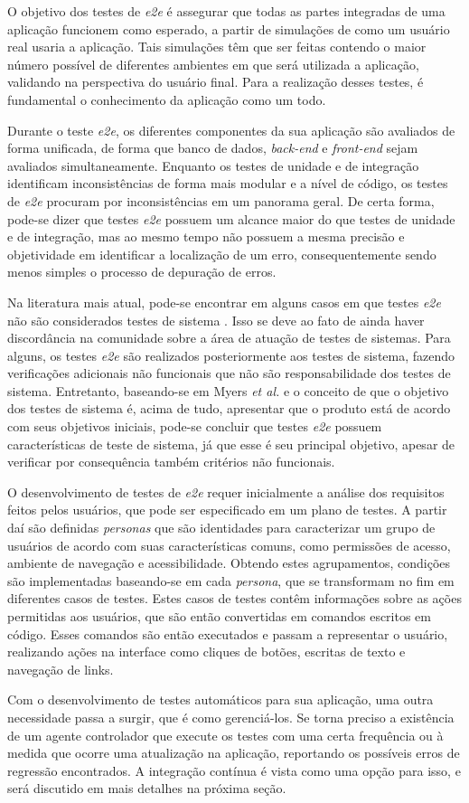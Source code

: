 O objetivo dos testes de \emph{e2e} é assegurar que todas as partes integradas de uma aplicação funcionem como esperado, a partir de simulações de como um usuário real usaria a aplicação. Tais simulações têm que ser feitas contendo o maior número possível de diferentes ambientes em que será utilizada a aplicação, validando na perspectiva do usuário final. Para a realização desses testes, é fundamental o conhecimento da aplicação como um todo.

Durante o teste \emph{e2e}, os diferentes componentes da sua aplicação são avaliados de forma unificada, de forma que banco de dados, \emph{back-end} e \emph{front-end} sejam avaliados simultaneamente. Enquanto os testes de unidade e de integração identificam inconsistências de forma mais modular e a nível de código, os testes de \emph{e2e} procuram por inconsistências em um panorama geral. De certa forma, pode-se dizer que testes \emph{e2e} possuem um alcance maior do que testes de unidade e de integração, mas ao mesmo tempo não possuem a mesma precisão e objetividade em identificar a localização de um erro, consequentemente sendo menos simples o processo de depuração de erros.

Na literatura mais atual, pode-se encontrar em alguns casos em que testes \emph{e2e} não são considerados testes de sistema \cite{chowdhury}. Isso se deve ao fato de ainda haver discordância na comunidade sobre a área de atuação de testes de sistemas. Para alguns, os testes \emph{e2e} são realizados posteriormente aos testes de sistema, fazendo verificações adicionais não funcionais que não são responsabilidade dos testes de sistema. Entretanto, baseando-se em Myers \emph{et al.} \cite{myers} e o conceito de que o objetivo dos testes de sistema é, acima de tudo, apresentar que o produto está de acordo com seus objetivos iniciais, pode-se concluir que testes \emph{e2e} possuem características de teste de sistema, já que esse é seu principal objetivo, apesar de verificar por consequência também critérios não funcionais.

O desenvolvimento de testes de \emph{e2e} requer inicialmente a análise dos requisitos feitos pelos usuários, que pode ser especificado em um plano de testes. A partir daí são definidas \emph{personas} que são identidades para caracterizar um grupo de usuários de acordo com suas características comuns, como permissões de acesso, ambiente de navegação e acessibilidade. Obtendo estes agrupamentos, condições são implementadas baseando-se em cada \emph{persona}, que se transformam no fim em diferentes casos de testes. Estes casos de testes contêm informações sobre as ações permitidas aos usuários, que são então convertidas em comandos escritos em código. Esses comandos são então executados e passam a representar o usuário, realizando ações na interface como cliques de botões, escritas de texto e navegação de links.

Com o desenvolvimento de testes automáticos para sua aplicação, uma outra necessidade passa a surgir, que é como gerenciá-los. Se torna preciso a existência de um agente controlador que execute os testes com uma certa frequência ou à medida que ocorre uma atualização na aplicação, reportando os possíveis erros de regressão encontrados. A integração contínua é vista como uma opção para isso, e será discutido em mais detalhes na próxima seção.
